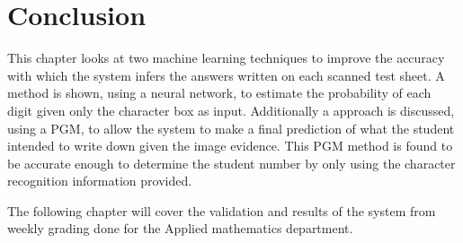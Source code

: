 \section{Conclusion}

This chapter looks at two machine learning techniques to improve the accuracy with which the system infers the answers written on each scanned test sheet. A method is shown, using a neural network, to estimate the probability of each digit given only the character box as input. Additionally a approach is discussed, using a PGM, to allow the system to make a final prediction of what the student intended to write down given the image evidence. This PGM method is found to be accurate enough to determine the student number by only using the character recognition information provided.

The following chapter will cover the validation and results of the system from weekly grading done for the Applied mathematics department.